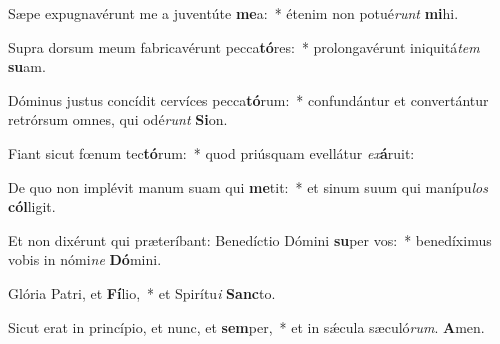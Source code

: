 Sæpe expugnavérunt me a juventúte \textbf{me}a:~* étenim non potué\textit{runt} \textbf{mi}hi.

Supra dorsum meum fabricavérunt pecca\textbf{tó}res:~* prolongavérunt iniquitá\textit{tem} \textbf{su}am.

Dóminus justus concídit cervíces pecca\textbf{tó}rum:~* confundántur et convertántur retrórsum omnes, qui odé\textit{runt} \textbf{Si}on.

Fiant sicut fœnum tec\textbf{tó}rum:~* quod priúsquam evellátur \textit{ex}\textbf{á}ruit:

De quo non implévit manum suam qui \textbf{me}tit:~* et sinum suum qui manípu\textit{los} \textbf{cól}ligit.

Et non dixérunt qui præteríbant: Benedíctio Dómini \textbf{su}per vos:~* benedíximus vobis in nómi\textit{ne} \textbf{Dó}mini.

Glória Patri, et \textbf{Fí}lio,~* et Spirítu\textit{i} \textbf{Sanc}to.

Sicut erat in princípio, et nunc, et \textbf{sem}per,~* et in sǽcula sæculó\textit{rum}. \textbf{A}men.


